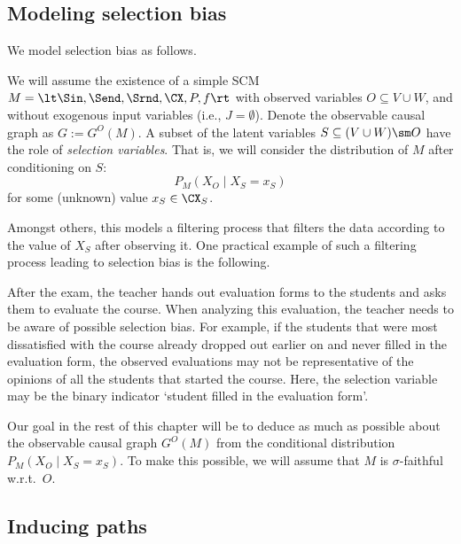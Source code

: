 \subsection{Modeling selection bias}
We model selection bias as follows. 
\begin{Not}
We will assume the existence of a simple SCM $M = \lt \Sin, \Send, \Srnd, \CX, P, f \rt$ with observed variables $O \subseteq V \cup W$, and without exogenous input variables (i.e., $J = \emptyset$).
Denote the observable causal graph as $G := G^O(M)$.
A subset of the latent variables $S \subseteq (V \cup W) \sm O$ have the role of \emph{selection variables}.
That is, we will consider the distribution of $M$ after conditioning on $S$:
$$P_M(X_O \mid X_S = x_S)$$
for some (unknown) value $x_S \in \CX_S$.
\end{Not}
Amongst others, this models a filtering process that filters the data according to the value of $X_S$ after observing it.
One practical example of such a filtering process leading to selection bias is the following.
\begin{Eg}
  After the exam, the teacher hands out evaluation forms to the students and asks them to evaluate the course.
  When analyzing this evaluation, the teacher needs to be aware of possible selection bias.
  For example, if the students that were most dissatisfied with the course already dropped out earlier on and never filled in the evaluation form, the observed evaluations may not be representative of the opinions of all the students that started the course.
  Here, the selection variable may be the binary indicator `student filled in the evaluation form'.
\end{Eg}
  
Our goal in the rest of this chapter will be to deduce as much as possible about the observable causal graph $G^O(M)$ from the conditional distribution $P_{M}(X_O \mid X_S = x_S)$. To make this possible, we will assume 
that $M$ is $\sigma$-faithful w.r.t.\ $O$. 

\subsection{Inducing paths}

